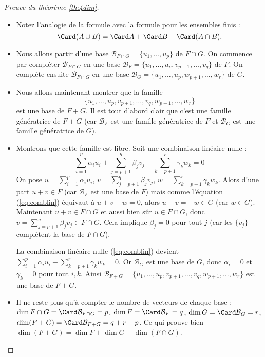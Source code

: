 \documentclass[class=report,crop=false]{standalone}
\begin{document}
\begin{proof}[Preuve du théorème \ref{th:4dim}]
~
\begin{itemize}
  \item Notez l'analogie de la formule avec la formule pour les ensembles finis :
$$\Card (A\cup B) = \Card A + \Card B - \Card (A\cap B).$$

  \item Nous allons partir d'une base $\mathcal{B}_{F \cap G} = \{u_1,\ldots,u_p\}$ de $F \cap G$.
On commence par compléter $\mathcal{B}_{F\cap G}$ en une base
$\mathcal{B}_F = \{u_1,\ldots,u_p,v_{p+1},\ldots,v_q\}$ de $F$.
On complète ensuite $\mathcal{B}_{F\cap G}$ en une base
$\mathcal{B}_G = \{u_1,\ldots,u_p,w_{p+1},\ldots,w_r\}$ de $G$.


  \item Nous allons maintenant montrer que la famille
  $$\{ u_1,\ldots,u_p,v_{p+1},\ldots,v_q,w_{p+1},\ldots,w_r\}$$
  est une base de $F+G$.
  Il est tout d'abord clair que c'est une famille génératrice de $F+G$ (car $\mathcal{B}_F$
  est une famille génératrice de $F$ et $\mathcal{B}_G$ est une famille génératrice de $G$).

  \item Montrons que cette famille est libre. Soit une combinaison linéaire nulle :
  \begin{equation}
  \sum_{i=1}^p \alpha_i u_i + \sum_{j=p+1}^q \beta_j v_j + \sum_{k=p+1}^r \gamma_k w_k = 0
  \label{eq:comblin}
  \end{equation}
  On pose $u=\sum_{i=1}^p \alpha_i u_i$, $v=\sum_{j=p+1}^q \beta_j v_j$, $w=\sum_{k=p+1}^r \gamma_k w_k$.
  Alors d'une part $u+v \in F$ (car $\mathcal{B}_F$ est une base de $F$) mais comme l'équation (\ref{eq:comblin})
  équivaut à $u+v+w=0$, alors $u+v = -w \in G$ (car $w\in G$).
  Maintenant $u+v \in F\cap G$ et aussi bien sûr $u\in F\cap G$, donc
  $v = \sum_{j=p+1}^q \beta_j v_j \in F\cap G$. Cela implique $\beta_j=0$ pour tout $j$ (car les $\{v_j\}$ complètent la base de $F\cap G$).

  La combinaison linéaire nulle (\ref{eq:comblin}) devient
  $\sum_{i=1}^p \alpha_i u_i  + \sum_{k=p+1}^r \gamma_k w_k = 0$.
  Or $\mathcal{B}_G$ est une base de $G$, donc $\alpha_i=0$ et $\gamma_k=0$ pour tout $i,k$.
  Ainsi $\mathcal{B}_{F+G} = \{ u_1,\ldots,u_p,v_{p+1},\ldots,v_q,w_{p+1},\ldots,w_r\}$ est une base de $F+G$.

  \item Il ne reste plus qu'à compter le nombre de vecteurs de chaque base :
  $\dim F\cap G = \Card \mathcal{B}_{F\cap G} = p$,
  $\dim F = \Card \mathcal{B}_{F} = q$,
  $\dim G = \Card \mathcal{B}_{G} = r$,
  $\dim (F+G) = \Card \mathcal{B}_{F+G} = q+r-p$.
  Ce qui prouve bien $\dim(F+G) = \dim F + \dim G - \dim (F\cap G)$.
\end{itemize}
\end{proof}
\end{document}
